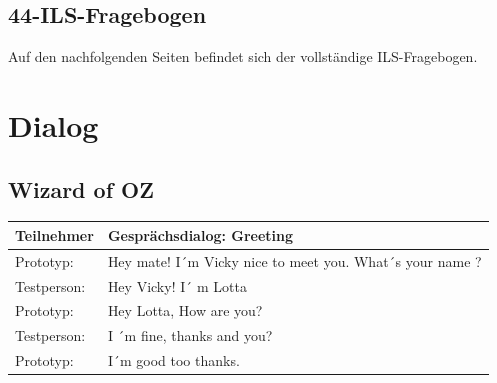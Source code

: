 \section{44-ILS-Fragebogen}

Auf den nachfolgenden Seiten befindet sich der vollständige ILS-Fragebogen. \parencite{ILS.1991}  \label{44ILS}




\chapter{Dialog}
\section{Wizard of OZ}   \label{tab:/Anhang_Dialogflow/G} 

\begingroup
  \footnotesize  
\begin{longtable}{|m{2.5cm}|m{12.0cm}|}
  \hline     
  \rowcolor[HTML]{EFEFEF}                                         
  \textbf{Teilnehmer} & \textbf{Gesprächsdialog: Greeting } \\ 
  \hline \hline  
  Prototyp: & Hey mate! I´m Vicky nice to meet you. What´s your name ?    \\ \hline
  Testperson: & Hey Vicky! I´ m Lotta\\ \hline
  \hline    
  Prototyp: & Hey Lotta, How are you?  \\  \hline  
  Testperson: & I ´m fine, thanks and you?\\ \hline
  \hline   
  Prototyp: & I´m good too thanks.  \\  \hline  
\end{longtable}
\endgroup  

